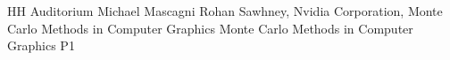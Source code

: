 {HH Auditorium}	%
{Michael Mascagni}		%
{Rohan Sawhney, Nvidia Corporation, Monte Carlo Methods in Computer Graphics}	%
{Monte Carlo Methods in Computer Graphics}		%
{P1}		%
\\\hline
